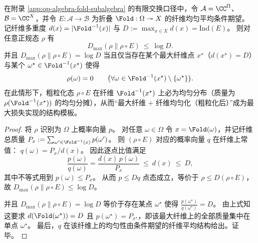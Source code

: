 \begin{corollary}\label{cor:op-algebra-commutative-dmax-extremizers-maxfiber}
在附录 \ref{app:op-algebra-fold-subalgebra} 的有限交换口径中，令 \(\mathcal{A}=\CC^{\Omega}\)、\(\mathcal{B}=\CC^{X}\)，并令 \(E:\mathcal{A}\to\mathcal{B}\) 为折叠 \(\Fold:\Omega\twoheadrightarrow X\) 的纤维均匀平均条件期望。
记纤维多重度 \(d(x)=|\Fold^{-1}(x)|\) 与 \(D:=\max_{x\in X}d(x)=\mathrm{Ind}(E)\)。
则对任意正规态 \(\rho\) 有
\[
D_{\max}(\rho\|\rho\!\circ\!E)\ \le\ \log D.
\]
并且 \(D_{\max}(\rho\|\rho\!\circ\!E)=\log D\) 当且仅当存在某个最大纤维点 \(x^\star\)（\(d(x^\star)=D\)）与某个 \(\omega^\star\in\Fold^{-1}(x^\star)\) 使得
\[
\rho(\omega)=0\qquad\bigl(\forall \omega\in\Fold^{-1}(x^\star)\setminus\{\omega^\star\}\bigr).
\]
在此情形下，粗粒化态 \(\rho\!\circ\!E\) 在纤维 \(\Fold^{-1}(x^\star)\) 上必为均匀分布（质量为 \(\rho(\Fold^{-1}(x^\star))\) 的均匀分摊），从而“最大纤维 + 纤维均匀化（粗粒化后）”成为最大损失实现的结构模板。
\end{corollary}
\begin{proof}
将 \(\rho\) 识别为 \(\Omega\) 上概率向量 \(p\)。
对任意 \(\omega\in\Omega\) 令 \(x=\Fold(\omega)\)，并记纤维总质量 \(P_x:=\sum_{\omega'\in\Fold^{-1}(x)}p(\omega')\)。
则 \((\rho\!\circ\!E)\) 对应的概率向量 \(q\) 在纤维上常值：
\(
q(\omega)=P_x/d(x)
\)。
因此逐点比值满足
\[
\frac{p(\omega)}{q(\omega)}=\frac{d(x)\,p(\omega)}{P_x}\ \le\ d(x)\ \le\ D,
\]
其中不等式用到 \(p(\omega)\le P_x\)。
从而 \(p\le Dq\) 点态成立，等价于 \(\rho\le D(\rho\!\circ\!E)\)，故
\(
D_{\max}(\rho\|\rho\!\circ\!E)\le \log D
\)。
\par
并且 \(D_{\max}(\rho\|\rho\!\circ\!E)=\log D\) 等价于存在某点 \(\omega^\star\) 使得 \(\frac{p(\omega^\star)}{q(\omega^\star)}=D\)。
由上式知这要求 \(d(\Fold(\omega^\star))=D\) 且 \(p(\omega^\star)=P_{x^\star}\)，即该最大纤维上的全部质量集中在单点 \(\omega^\star\)。
最后，\(q\) 在该纤维上的均匀性由条件期望的纤维平均结构给出。证毕。
\end{proof}

